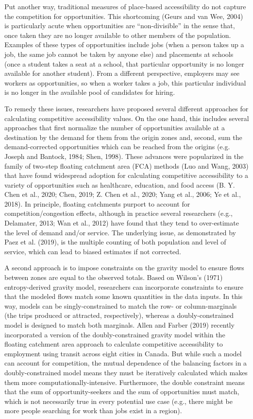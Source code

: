 \documentclass[]{elsarticle} %
\begin{document}
Put another way, traditional measures of place-based accessibility do
not capture the competition for opportunities. This shortcoming (Geurs
and van Wee, 2004) is particularly acute when opportunities are
``non-divisible'' in the sense that, once taken they are no longer
available to other members of the population. Examples of these types of
opportunities include jobs (when a person takes up a job, the same job
cannot be taken by anyone else) and placements at schools (once a
student takes a seat at a school, that particular opportunity is no
longer available for another student). From a different perspective,
employers may see workers as opportunities, so when a worker takes a
job, this particular individual is no longer in the available pool of
candidates for hiring.

To remedy these issues, researchers have proposed several different
approaches for calculating competitive accessibility values. On the one
hand, this includes several approaches that first normalize the number
of opportunities available at a destination by the demand for them from
the origin zones and, second, sum the demand-corrected opportunities
which can be reached from the origins (e.g. Joseph and Bantock, 1984;
Shen, 1998). These advances were popularized in the family of two-step
floating catchment area (FCA) methods (Luo and Wang, 2003) that have
found widespread adoption for calculating competitive accessibility to a
variety of opportunities such as healthcare, education, and food access
(B. Y. Chen et al., 2020; Chen, 2019; Z. Chen et al., 2020; Yang et al.,
2006; Ye et al., 2018). In principle, floating catchments purport to
account for competition/congestion effects, although in practice several
researchers (e.g., Delamater, 2013; Wan et al., 2012) have found that
they tend to over-estimate the level of demand and/or service. The
underlying issue, as demonstrated by Paez et al. (2019), is the multiple
counting of both population and level of service, which can lead to
biased estimates if not corrected.

A second approach is to impose constraints on the gravity model to
ensure flows between zones are equal to the observed totals. Based on
Wilson's (1971) entropy-derived gravity model, researchers can
incorporate constraints to ensure that the modeled flows match some
known quantities in the data inputs. In this way, models can be
singly-constrained to match the row- or column-marginals (the trips
produced or attracted, respectively), whereas a doubly-constrained model
is designed to match both marginals. Allen and Farber (2019) recently
incorporated a version of the doubly-constrained gravity model within
the floating catchment area approach to calculate competitive
accessibility to employment using transit across eight cities in Canada.
But while such a model can account for competition, the mutual
dependence of the balancing factors in a doubly-constrained model means
they must be iteratively calculated which makes them more
computationally-intensive. Furthermore, the double constraint means that
the sum of opportunity-seekers and the sum of opportunities must match,
which is not necessarily true in every potential use case (e.g., there
might be more people searching for work than jobs exist in a region).
\end{document}
